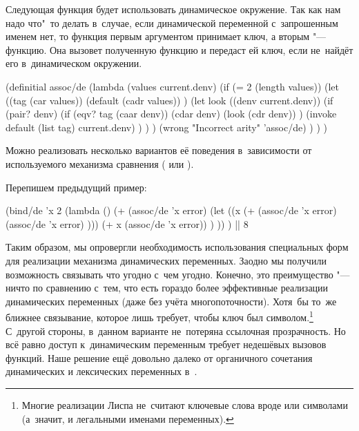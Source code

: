 Следующая функция будет использовать динамическое окружение. Так как нам надо
что"~то делать в~случае, если динамической переменной с~запрошенным именем нет,
то функция  первым аргументом принимает ключ, а вторым "---
функцию. Она вызовет полученную функцию и передаст ей ключ, если не~найдёт его
в~динамическом окружении.

\begin{code:lisp}
(definitial assoc/de
  (lambda (values current.denv)
    (if (= 2 (length values))
        (let ((tag     (car values))
              (default (cadr values)) )
          (let look ((denv current.denv))
            (if (pair? denv)
                (if (eqv? tag (caar denv))
                    (cdar denv)
                    (look (cdr denv)) )
                (invoke default (list tag) current.denv) ) ) )
        (wrong "Incorrect arity" 'assoc/de) ) ) )
\end{code:lisp}

Можно реализовать несколько вариантов её поведения в~зависимости от
используемого механизма сравнения ( или ).


Перепишем предыдущий пример:

\begin{code:lisp}
(bind/de 'x 2
  (lambda () (+ (assoc/de 'x error)
                (let ((x (+ (assoc/de 'x error)
                            (assoc/de 'x error) )))
                  (+ x (assoc/de 'x error)) ) )) )
|\is| 8
\end{code:lisp}

Таким образом, мы опровергли необходимость использования специальных форм для
реализации механизма динамических переменных. Заодно мы получили возможность
связывать что угодно с~чем угодно. Конечно, это преимущество "--- ничто по
сравнению с~тем, что есть гораздо более эффективные реализации динамических
переменных (даже без учёта многопоточности). Хотя~бы то~же ближнее связывание,
которое лишь требует, чтобы ключ был символом.\footnote*{Многие реализации Лиспа
не~считают ключевые слова вроде  или  символами (а~значит, и
легальными именами переменных).} С~другой стороны, в~данном варианте не~потеряна
ссылочная прозрачность. Но всё равно доступ к~динамическим переменным требует
недешёвых вызовов функций. Наше решение ещё довольно далеко от органичного
сочетания динамических и лексических переменных в~{\CommonLisp}.

